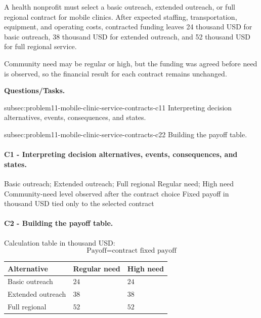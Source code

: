 	A health nonprofit must select a basic outreach, extended outreach, or full regional contract for mobile clinics. After expected staffing, transportation, equipment, and operating costs, contracted funding leaves 24 thousand USD for basic outreach, 38 thousand USD for extended outreach, and 52 thousand USD for full regional service.
	
	Community need may be regular or high, but the funding was agreed before need is observed, so the financial result for each contract remains unchanged.

	\textbf{Questions/Tasks.}
	\begin{enumerate}
		\CriterionTask
		{subsec:problem11-mobile-clinic-service-contracts-c1}{1}
		{Interpreting decision alternatives, events, consequences, and states.}

		\CriterionTask
		{subsec:problem11-mobile-clinic-service-contracts-c2}{2}
		{Building the payoff table.}
	\end{enumerate}

\paragraph*{C1 - Interpreting decision alternatives, events, consequences, and states.}
	\label{subsec:problem11-mobile-clinic-service-contracts-c1}
	\DecisionElementsTable
	{Basic outreach; Extended outreach; Full regional}
	{Regular need; High need}
	{Community-need level observed after the contract choice}
	{Fixed payoff in thousand USD tied only to the selected contract}


\paragraph*{C2 - Building the payoff table.}
	\label{subsec:problem11-mobile-clinic-service-contracts-c2}
	Calculation table in thousand USD:
	\[
	\text{Payoff}=\text{contract fixed payoff}
	\]
	\begin{center}
		\begin{tabular}{lll}
			\toprule
			Alternative & Regular need & High need \\
			\midrule
			Basic outreach & $24$ & $24$ \\
			Extended outreach & $38$ & $38$ \\
			Full regional & $52$ & $52$ \\
			\bottomrule
		\end{tabular}
	\end{center}

